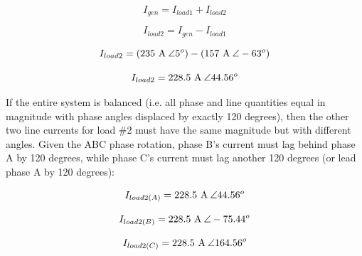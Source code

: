 $$I_{gen} = I_{load1} + I_{load2}$$

$$I_{load2} = I_{gen} - I_{load1}$$

$$I_{load2} = (235 \hbox{ A} \> \angle 5^o) - (157 \hbox{ A} \> \angle -63^o)$$

$$I_{load2} = 228.5 \hbox{ A} \> \angle 44.56^o$$

If the entire system is balanced (i.e. all phase and line quantities equal in magnitude with phase angles displaced by exactly 120 degrees), then the other two line currents for load \#2 must have the same magnitude but with different angles.  Given the ABC phase rotation, phase B's current must lag behind phase A by 120 degrees, while phase C's current must lag another 120 degrees (or lead phase A by 120 degrees):

$$I_{load2(A)} = 228.5 \hbox{ A} \> \angle 44.56^o$$

$$I_{load2(B)} = 228.5 \hbox{ A} \> \angle -75.44^o$$

$$I_{load2(C)} = 228.5 \hbox{ A} \> \angle 164.56^o$$





